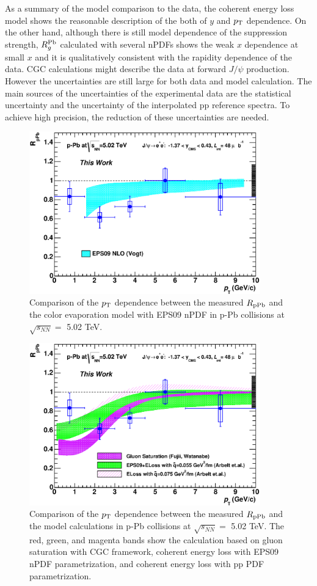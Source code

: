 As a summary of the model comparison to the data, the coherent energy loss model shows the reasonable description of the both of $y$ and $p_{\rm{T}}$ dependence. 
On the other hand, although there is still model dependence of the suppression strength, $R_{g}^{\rm{Pb}}$ calculated with several nPDFs shows the weak $x$ dependence at small $x$ and it is qualitatively consistent with the rapidity dependence of the data.  
CGC calculations might describe the data at forward $J/\psi$ production. 
However the uncertainties are still large for both data and model calculation. 
The main sources of the uncertainties of the experimental data are the statistical uncertainty and the uncertainty of the interpolated pp reference spectra. 
To achieve high precision, the reduction of these uncertainties are needed.  
\begin{figure}[!h]
  \centering
  \includegraphics[width=10cm]{chap5/figure/ModelComp/RpPb_MB_wModelEPS_Pt_bin2_tw.eps}
  \caption{Comparison of the $p_{\rm{T}}$ dependence between the measured $R_{\rm{pPb}}$ and the color evaporation model with EPS09 nPDF in p-Pb collisions at $\sqrt{s_{NN}}=$ 5.02 TeV.}
  \label{fig_5_rppbm}
\end{figure}

\begin{figure}[!h]
  \centering
  \includegraphics[width=10cm]{chap5/figure/ModelComp/RpPb_MB_w3Model_Pt_bin2_tw.eps}
  \caption{Comparison of the $p_{\rm{T}}$ dependence between the measured $R_{\rm{pPb}}$ and the model calculations in p-Pb collisions at $\sqrt{s_{NN}}=$ 5.02 TeV. The red, green, and magenta bands show the calculation based on gluon saturation with CGC framework, coherent energy loss with EPS09 nPDF parametrization, and coherent energy loss with pp PDF parametrization. }
  \label{fig_5_rppbm3}
\end{figure}

